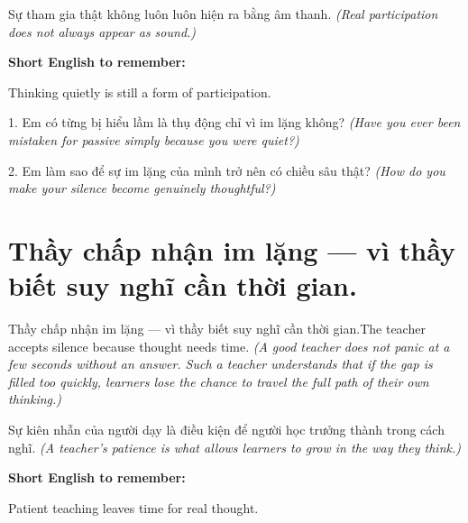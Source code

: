 \begin{baihoc}
Sự tham gia thật không luôn luôn hiện ra bằng âm thanh.
\textit{(Real participation does not always appear as sound.)}
\end{baihoc}

\begin{ghinhoanh}
\textbf{Short English to remember:}

Thinking quietly is still a form of participation.

\end{ghinhoanh}

\begin{tuhocnhanh}
1. Em có từng bị hiểu lầm là thụ động chỉ vì im lặng không? \textit{(Have you ever been mistaken for passive simply because you were quiet?)}

2. Em làm sao để sự im lặng của mình trở nên có chiều sâu thật? \textit{(How do you make your silence become genuinely thoughtful?)}
\end{tuhocnhanh}
\ngancach


\section{Thầy chấp nhận im lặng — vì thầy biết suy nghĩ cần thời gian.}
\begin{truyen}{Thầy chấp nhận im lặng — vì thầy biết suy nghĩ cần thời gian.}{The teacher accepts silence because thought needs time.}
\textit{(A good teacher does not panic at a few seconds without an answer. Such a teacher understands that if the gap is filled too quickly, learners lose the chance to travel the full path of their own thinking.)}
\end{truyen}

\begin{baihoc}
Sự kiên nhẫn của người dạy là điều kiện để người học trưởng thành trong cách nghĩ.
\textit{(A teacher's patience is what allows learners to grow in the way they think.)}
\end{baihoc}

\begin{ghinhoanh}
\textbf{Short English to remember:}

Patient teaching leaves time for real thought.

\end{ghinhoanh}

